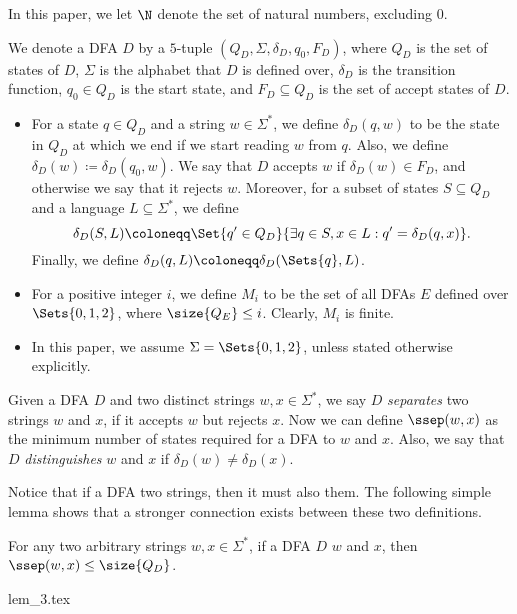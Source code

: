 \documentclass[preprint, 12pt]{elsarticle}
\begin{document}
	In this paper, we let $\N$ denote the set of natural numbers, excluding $0$.
	
	\begin{definition}
	We denote a DFA $D$ by a $5$-tuple $(Q_D,\Sigma,\delta_D,q_0,F_D)$, where $Q_D$ is the set of states of $D$, $\Sigma$ is the alphabet that $D$ is defined over, $\delta_D$ is the transition function, $q_0 \in Q_D$ is the start state, and $F_D \subseteq Q_D$ is the set of accept states of $D$.
	\begin{itemize}			
		\item
			For a state $q \in Q_D$ and a string $w \in \Sigma^*$, we define $\delta_D(q, w)$ to be the state in $Q_D$ at which we end if we start reading $w$ from $q$.
			Also, we define $\delta_D(w) \coloneqq \delta_D(q_0,w)$. We say that $D$ accepts $w$ if $\delta_D(w) \in F_D$, and otherwise we say that it rejects $w$.  Moreover, for a subset of states $S \subseteq Q_D$ and a language $L \subseteq \Sigma^*$, we define
			$$\delta_D(S, L) \coloneqq \Set{q' \in Q_D}{\exists q \in S, x \in L : q' = \delta_D(q, x)}.$$
			Finally, we define $\delta_D(q, L) \coloneqq \delta_D(\Sets{q}, L)$.
		\item
			For a positive integer $i$, we define $M_i$ to be the set of all DFAs $E$ defined over $\Sets{0,1,2}$, where $\size{Q_E} \leq i$. Clearly, $M_i$ is finite.
		\item 	
			In this paper, we assume $\Sigma = \Sets{0, 1, 2}$, unless stated otherwise explicitly.
			
		\end{itemize}		
	\end{definition}
		
	\begin{definition}
		Given a DFA $D$ and two distinct strings $w,x \in \Sigma^*$, we say  $D$ \textit{separates} two strings $w$ and $x$, if it accepts $w$ but rejects $x$. Now we can define $\ssep(w,x)$ as the minimum number of states required for a DFA to \separate $w$ and $x$.
		Also, we say that $D$ \textit{distinguishes} $w$ and $x$ if $\delta_D(w) \neq \delta_D(x)$.
	\end{definition}
	Notice that if a DFA \separates two strings, then it must also \distinguish them. The following simple lemma shows that a stronger connection exists between these two definitions.
	\begin{lemma}
		\label{lem:3}
		For any two arbitrary strings $w,x \in \Sigma^*$, if a DFA $D$ \distinguishes $w$ and $x$, then $\ssep(w,x) \le \size{Q_D}$.
	\end{lemma}
	{lem_3.tex}
\end{document}
